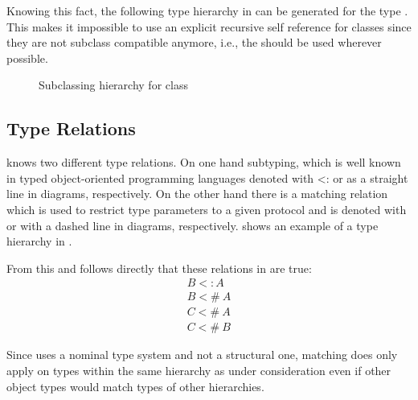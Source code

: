 Knowing this fact, the following type hierarchy in
 can be generated for the type \C. This makes
it impossible to use an explicit recursive self reference for classes
since they are not subclass compatible anymore, i.e., the \mytype should
be used wherever possible.

\begin{figure}[ht]
	\centering
	\caption{Subclassing hierarchy for class \C}
	\label{fig:fixedHierarchy}
\end{figure}
%

\subsection{Type Relations}
\ooplss knows two different type relations. On one hand subtyping, which
is well known in typed object-oriented programming languages denoted with
<: or as a straight line in diagrams, respectively. On the other hand
there is a matching relation which is used to restrict type parameters
to a given protocol and is denoted with \match or with a dashed line in
diagrams, respectively.  shows an example of a type
hierarchy in \ooplss.

From this and  follows directly that these
relations in  are true:
\begin{align}
B <: A \\
B <\!\!\#~A \label{alg:match} \\
C <\!\!\#~A \\
C <\!\!\#~B
\end{align}

Since \ooplss uses a nominal type system and not a structural one,
matching does only apply on types within the same hierarchy as under
consideration even if other object types would match types of other
hierarchies.


